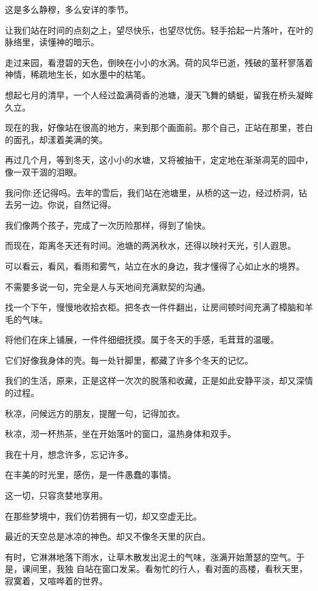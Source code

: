 \documentclass[12pt,a4paper]{article}
\begin{document}
		这是多么静穆，多么安详的季节。

		让我们站在时间的点刻之上，望尽快乐，也望尽忧伤。轻手拾起一片落叶，在叶的脉络里，读懂神的暗示。\par
		走过来园，看澄碧的天色，倒映在小小的水涡。荷的风华已逝，残破的茎秆寥落着神情，稀疏地生长，如水墨中的枯笔。\par
		想起七月的清早，一个人经过盈满荷香的池塘，漫天飞舞的蜻蜓，留我在桥头凝眸久立。\par
		现在的我，好像站在很高的地方，来到那个画面前。那个自己，正站在那里，苍白的面孔，却漾着美满的笑。\par
		再过几个月，等到冬天，这小小的水塘，又将被抽干，定定地在渐渐凋芜的园中，像一双干涸的泪眼。\par
		我问你:还记得吗。去年的雪后，我们站在池塘里，从桥的这一边，经过桥洞，钻去另一边。你说，自然记得。\par
		我们像两个孩子，完成了一次历险那样，得到了愉快。

		而现在，距离冬天还有时间。池塘的两涡秋水，还得以映衬天光，引人遐思。\par
		可以看云，看风，看雨和雾气，站立在水的身边，我才懂得了心如止水的境界。\par
		不需要多说一句，完全是人与天地间充满默契的沟通。

		找一个下午，慢慢地收拾衣柜。把冬衣一件件翻出，让房间顿时间充满了樟脑和羊毛的气味。\par
		将他们在床上铺展，一件件细细抚摸。属于冬天的手感，毛茸茸的温暖。\par
		它们好像我身体的壳。每一处针脚里，都藏了许多个冬天的记忆。\par
		我们的生活，原来，正是这样一次次的脱落和收藏，正是如此安静平淡，却又深情的过程。

		秋凉，问候远方的朋友，提醒一句，记得加衣。\par
		秋凉，沏一杯热茶，坐在开始落叶的窗口，温热身体和双手。\par
		我在十月，想念许多，忘记许多。\par
		在丰美的时光里，感伤，是一件愚蠢的事情。\par
		这一切，只容贪婪地享用。

	\endwriting



		在那些梦境中，我们仿若拥有一切，却又空虚无比。

		最近的天空总是冰凉的神色。却又不像冬天里的灰白。

		有时，它淋淋地落下雨水，让草木散发出泥土的气味，涨满开始萧瑟的空气。于是，课间里，我独
	自站在窗口发呆。看匆忙的行人，看对面的高楼，看秋天里，寂寞着，又喧哗着的世界。
\end{document}
